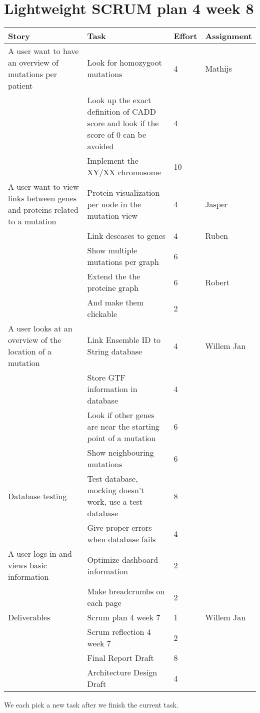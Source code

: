 \documentclass[a4paper]{report}
\begin{document}


\section*{Lightweight SCRUM plan 4 week 8}

\setlength\extrarowheight{5pt}
\begin{table}[ht]
\begin{tabular}{p{5cm}|p{5cm}|p{1cm}|p{2cm}}

\textbf{Story} & \textbf{Task} & \textbf{Effort} & \textbf{Assignment}\\
\hline \hline

A user want to have an overview of mutations per patient & Look for homozygoot mutations & 4 & Mathijs\\
& Look up the exact definition of CADD score and look if the score of 0 can be avoided & 4 &\\
& Implement the XY/XX chromosome & 10 &\\
\hline

A user want to view links between genes and proteins related to a mutation & Protein visualization per node in the mutation view & 4 & Jasper\\
& Link deseases to genes & 4 & Ruben\\
& Show multiple mutations per graph & 6 & \\
& Extend the the proteine graph & 6 & Robert\\
& And make them clickable & 2 &\\
\hline

A user looks at an overview of the location of a mutation & Link Ensemble ID to String database & 4 & Willem Jan\\
& Store GTF information in database & 4 & \\
& Look if other genes are near the starting point of a mutation & 6 &\\
& Show neighbouring mutations & 6 &\\
\hline

Database testing & Test database, mocking doesn't work, use a test database & 8 &\\
& Give proper errors when database fails & 4 &\\
\hline

A user logs in and views basic information & Optimize dashboard information & 2 & \\
& Make breadcrumbs on each page & 2 & \\
\hline

Deliverables & Scrum plan 4 week 7 & 1 & Willem Jan\\
& Scrum reflection 4 week 7 & 2 &\\
& Final Report Draft & 8 &\\
& Architecture Design Draft & 4 &\\
\hline
\end{tabular}
\end{table}

We each pick a new task after we finish the current task.
\end{document}

